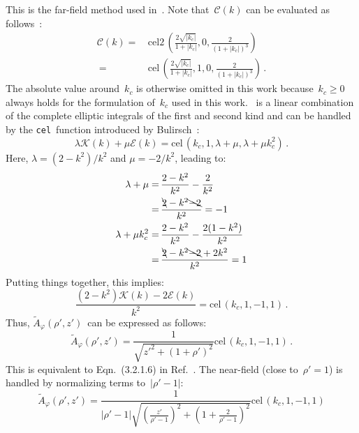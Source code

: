 This is the far-field method used in~.
Note that~$\mathcal{C}(k)$ can be evaluated as follows~\cite{bulirsch_1, bulirsch_3}:
\begin{align}
  \mathcal{C}(k) =&\, \textrm{cel2}\,\left(\frac{2 \sqrt{|k_c|}}{1+|k_c|},0,\frac{2}{(1+|k_c|)^3}\right) \nonumber \\
       ~         =&\, \textrm{cel}\,\left(\frac{2 \sqrt{|k_c|}}{1+|k_c|},1,0,\frac{2}{(1+|k_c|)^3}\right) \, .
\end{align}
The absolute value around~$k_c$ is otherwise omitted in this work
because~$k_c \geq 0$ always holds for the formulation of~$k_c$ used in this work.
~is a linear combination of the complete elliptic integrals
of the first and second kind and can be handled by the \texttt{cel}~function
introduced by Bulirsch~\cite{bulirsch_3}:
\begin{equation}
  \lambda \mathcal{K} (k) + \mu \mathcal{E} (k) = \textrm{cel}\,(k_c, 1, \lambda + \mu, \lambda + \mu k_c^2) \, .
\end{equation}
Here, $\lambda = (2 - k^2)/k^2$ and $\mu = -2/k^2$,
leading to:
\begin{align}
  \lambda + \mu       =&\, \frac{2 - k^2}{k^2} - \frac{2}{k^2} \nonumber \\
      ~               =&\, \frac{\bcancel{2} - k^2 \bcancel{-2}}{k^2} = -1 \nonumber \\
  \lambda + \mu k_c^2 =&\, \frac{2 - k^2}{k^2} - \frac{2 (1 - k^2)}{k^2} \nonumber \\
      ~               =&\, \frac{\bcancel{2} - k^2 \bcancel{-2} + 2 k^2}{k^2} = 1
\end{align}
Putting things together, this implies:
\begin{equation}
 \frac{(2 - k^2)\mathcal{K}(k) - 2 \mathcal{E}(k)}{k^2} = \textrm{cel}\,(k_c, 1, -1, 1) \, . \label{eqn:cel_kc_1}
\end{equation}
Thus, $\tilde{A}_\varphi(\rho',z')$~can be expressed as follows:
\begin{equation}
 \tilde{A}_\varphi(\rho',z')
 = \frac{1}{\sqrt{z'^2 + (1 + \rho')^2}}
   \textrm{cel}\,(k_c, 1, -1, 1) \, . \label{eqn:cwl_A_phi_using_cel}
\end{equation}
This is equivalent to Eqn.~(3.2.1.6) in Ref.~\cite{teal}.
The near-field (close to~$\rho' = 1$) is handled by normalizing terms to~$|\rho'-1|$:
\begin{equation}
 \tilde{A}_\varphi(\rho',z')
 = \frac{1}{|\rho'-1| \sqrt{\left(\frac{z'}{\rho'-1}\right)^2 + \left(1 + \frac{2}{\rho'-1}\right)^2}}
   \textrm{cel}\,(k_c, 1, -1, 1) \label{eqn:cwl_A_phi_near}
\end{equation}
